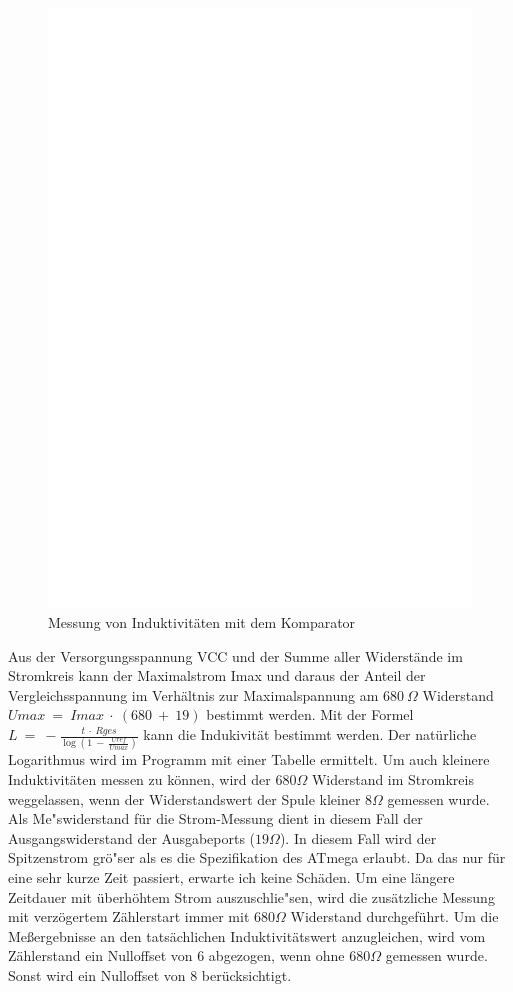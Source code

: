 \begin{figure}[H]
\centering
\includegraphics[]{../FIG/Inductance.eps}
\caption{Messung von Induktivit\"aten mit dem Komparator}
\label{fig:Inductance}
\end{figure}

Aus der Versorgungsspannung VCC und der Summe aller Widerst\"ande im Stromkreis kann der Maximalstrom Imax und
daraus der Anteil der Vergleichsspannung im Verh\"altnis zur Maximalspannung am \(680~\Omega\) Widerstand
\(Umax~=~Imax~\cdot~(680~+~19)\) bestimmt werden.
Mit der Formel \(L~=~-\frac{t~\cdot~Rges}{\log{(1~-~\frac{Uref}{Umax})}}\) kann die Indukivit\"at bestimmt werden.
Der nat\"urliche Logarithmus wird im Programm mit einer Tabelle ermittelt.
Um auch kleinere Induktivit\"aten messen zu k\"onnen, wird der \(680 \Omega\) Widerstand im Stromkreis weggelassen,
wenn der Widerstandswert der Spule kleiner \(8 \Omega\) gemessen wurde. Als Me"swiderstand f\"ur die Strom-Messung
dient in diesem Fall der Ausgangswiderstand der Ausgabeports (\(19 \Omega\)). In diesem Fall wird der Spitzenstrom gr\"o"ser
als es die Spezifikation des ATmega erlaubt. Da das nur f\"ur eine sehr kurze Zeit passiert, erwarte ich keine Sch\"aden.
Um eine l\"angere Zeitdauer mit \"uberh\"ohtem Strom auszuschlie"sen, wird die zus\"atzliche Messung mit 
verz\"ogertem Z\"ahlerstart immer mit \(680 \Omega\) Widerstand durchgef\"uhrt.
Um die Meßergebnisse an den tats\"achlichen Induktivit\"atswert anzugleichen, wird vom Z\"ahlerstand ein
Nulloffset von 6 abgezogen, wenn ohne \(680 \Omega\) gemessen wurde. Sonst wird ein Nulloffset von 8 ber\"ucksichtigt.


